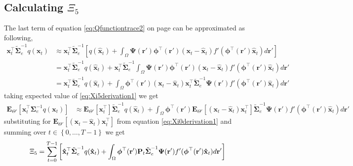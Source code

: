 \documentclass[]{article}
\begin{document}
\subsection*{Calculating $\Xi_{5}$}
The last term of equation \ref{eq:Qfunctiontrace2} on page \pageref{eq:Qfunctiontrace2} can be approximated as following, 
\begin{align}\label{eq:Xi5derivation1}
 \mathbf x_t^\top\tilde{\boldsymbol\Sigma}_e^{-1}q(\mathbf x_t)&\approx\mathbf x_t^\top\tilde{\boldsymbol\Sigma}_e^{-1}\left[q(\mathbf {\hat x}_t)+\int_\Omega \boldsymbol{\Psi}(\mathbf{r}')\boldsymbol \phi^\top(\mathbf r') (\mathbf x_t - \mathbf  {\hat x}_t)f'(\boldsymbol \phi^\top(\mathbf r')\mathbf {\hat x}_t) d\mathbf{r}'\right] \nonumber\\
&=\mathbf x_t^\top\tilde{\boldsymbol\Sigma}_e^{-1}q(\mathbf {\hat x}_t)+\mathbf x_t^\top\tilde{\boldsymbol\Sigma}_e^{-1}\int_\Omega \boldsymbol{\Psi}(\mathbf{r}')\boldsymbol \phi^\top(\mathbf r') (\mathbf x_t - \mathbf  {\hat x}_t)f'(\boldsymbol \phi^\top(\mathbf r')\mathbf {\hat x}_t) d\mathbf{r}' \nonumber \\
&=\mathbf x_t^\top\tilde{\boldsymbol\Sigma}_e^{-1}q(\mathbf {\hat x}_t)+\int_\Omega \boldsymbol \phi^\top(\mathbf r') (\mathbf x_t - \mathbf  {\hat x}_t)\mathbf x_t^\top\tilde{\boldsymbol\Sigma}_e^{-1}\boldsymbol{\Psi}(\mathbf{r}')f'(\boldsymbol \phi^\top(\mathbf r')\mathbf {\hat x}_t) d\mathbf{r}'
\end{align}
taking expected value of \ref{eq:Xi5derivation1} we get
\begin{align}\label{eq:Xi5derivation2}
\mathbf E_{\Theta'}\left[\mathbf x_t^\top\boldsymbol\Sigma_e^{-1}q(\mathbf x_t)\right]&\approx\mathbf E_{\Theta'}\left[\mathbf x_t^\top\right]\tilde{\boldsymbol\Sigma}_e^{-1}q(\mathbf {\hat x}_t)+\int_\Omega \boldsymbol \phi^\top(\mathbf r') \mathbf E_{\Theta'}\left[(\mathbf x_t - \mathbf  {\hat x}_t)\mathbf x_t^\top\right]\tilde{\boldsymbol\Sigma}_e^{-1}\boldsymbol{\Psi}(\mathbf{r}')f'(\boldsymbol \phi^\top(\mathbf r')\mathbf {\hat x}_t) d\mathbf{r}' 
\end{align}
substituting for $\mathbf E_{\Theta'}\left[(\mathbf x_t - \mathbf  {\hat x}_t)\mathbf x_t^\top\right] $ from equation \ref{eq:Xi0derivation1} and summing over $t \in \left\lbrace 0, \dots, T-1\right\rbrace $ we get
\begin{equation}
\Xi_5=\sum_{t=0}^{T-1}\left[\mathbf{ \hat x}_t^\top\tilde{\boldsymbol\Sigma}_e^{-1}q(\mathbf {\hat x}_t)+\int_\Omega \boldsymbol \phi^\top(\mathbf r') \mathbf P_t\tilde{\boldsymbol\Sigma}_e^{-1}\boldsymbol{\Psi}(\mathbf{r}')f'(\boldsymbol \phi^\top(\mathbf r')\mathbf {\hat x}_t) d\mathbf{r}' \right] \\	
\end{equation}
\end{document}
